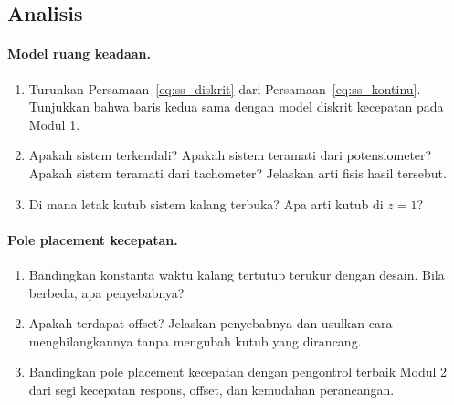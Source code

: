 \documentclass[11pt,a4paper]{article}
\begin{document}
\subsection{Analisis}
\label{sec:analisis}

\paragraph{Model ruang keadaan.}
\begin{enumerate}
\item Turunkan Persamaan~\eqref{eq:ss_diskrit} dari Persamaan~\eqref{eq:ss_kontinu}. Tunjukkan bahwa baris kedua sama dengan model diskrit kecepatan pada Modul 1.
\item Apakah sistem terkendali? Apakah sistem teramati dari potensiometer? Apakah sistem teramati dari tachometer? Jelaskan arti fisis hasil tersebut.
\item Di mana letak kutub sistem kalang terbuka? Apa arti kutub di $z = 1$?
\end{enumerate}

\paragraph{Pole placement kecepatan.}
\begin{enumerate}[resume]
\item Bandingkan konstanta waktu kalang tertutup terukur dengan desain. Bila berbeda, apa penyebabnya?
\item Apakah terdapat offset? Jelaskan penyebabnya dan usulkan cara menghilangkannya tanpa mengubah kutub yang dirancang.
\item Bandingkan pole placement kecepatan dengan pengontrol terbaik Modul 2 dari segi kecepatan respons, offset, dan kemudahan perancangan.
\end{enumerate}
\end{document}
